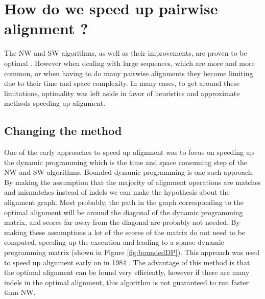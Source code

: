 \documentclass[
  11pt,
  twoside]{scrbook}
\begin{document}
\hypertarget{how-do-we-speed-up-pairwise-alignment}{%
\section{How do we speed up pairwise alignment ?}\label{how-do-we-speed-up-pairwise-alignment}}

The NW and SW algorithms, as well as their improvements, are proven to be optimal \autocite{pearson27DynamicProgramming1992}. However when dealing with large sequences, which are more and more common, or when having to do many pairwise alignments they become limiting due to their time and space complexity. In many cases, to get around these limitations, optimality was left aside in favor of heuristics and approximate methods speeding up alignment.

\hypertarget{changing-the-method}{%
\subsection{Changing the method}\label{changing-the-method}}

One of the early approaches to speed up alignment was to focus on speeding up the dynamic programming which is the time and space consuming step of the NW and SW algorithms. Bounded dynamic programming \autocite{spougeSpeedingDynamicProgramming1989a} is one such approach. By making the assumption that the majority of alignment operations are matches and mismatches instead of indels we can make the hypothesis about the alignment graph. Most probably, the path in the graph corresponding to the optimal alignment will be around the diagonal of the dynamic programming matrix, and scores far away from the diagonal are probably not needed. By making these assumptions a lot of the scores of the matrix do not need to be computed, speeding up the execution and leading to a sparse dynamic programming matrix (shown in Figure \ref{fig:boundedDP}). This approach was used to speed up alignment early on in 1984 \autocite{fickettFastOptimalAlignment1984}. The advantage of this method is that the optimal alignment can be found very efficiently, however if there are many indels in the optimal alignment, this algorithm is not guaranteed to run faster than NW.
\end{document}
